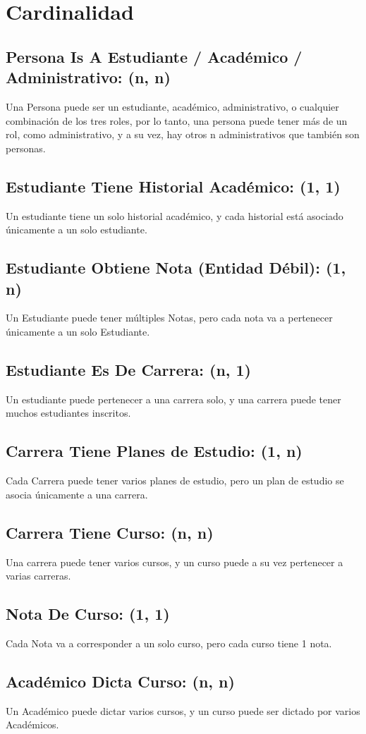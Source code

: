 \documentclass[12pt]{article}
\begin{document}
\section*{Cardinalidad}
\subsection*{Persona Is A Estudiante / Académico / Administrativo: (n, n)}
Una Persona puede ser un estudiante, académico, administrativo, o cualquier combinación de los tres roles, por lo tanto, una persona puede tener más de un rol, como administrativo, 
y a su vez, hay otros n administrativos que también son personas. 
\subsection*{Estudiante Tiene Historial Académico: (1, 1)}
Un estudiante tiene un solo historial académico, y cada historial está asociado únicamente a un solo estudiante. 
\subsection*{Estudiante Obtiene Nota (Entidad Débil): (1, n)}
Un Estudiante puede tener múltiples Notas, pero cada nota va a pertenecer únicamente a un solo Estudiante. 
\subsection*{Estudiante Es De Carrera: (n, 1)}
Un estudiante puede pertenecer a una carrera solo, y una carrera puede tener muchos estudiantes inscritos.  
\subsection*{Carrera Tiene Planes de Estudio: (1, n)}
Cada Carrera puede tener varios planes de estudio, pero un plan de estudio se asocia únicamente a una carrera.  
\subsection*{Carrera Tiene Curso: (n, n)}
Una carrera puede tener varios cursos, y un curso puede a su vez pertenecer a varias carreras. 
\subsection*{Nota De Curso: (1, 1)}
Cada Nota va a corresponder a un solo curso, pero cada curso tiene 1 nota.
\subsection*{Académico Dicta Curso: (n, n)}
Un Académico puede dictar varios cursos, y un curso puede ser dictado por varios Académicos. 
\end{document}
